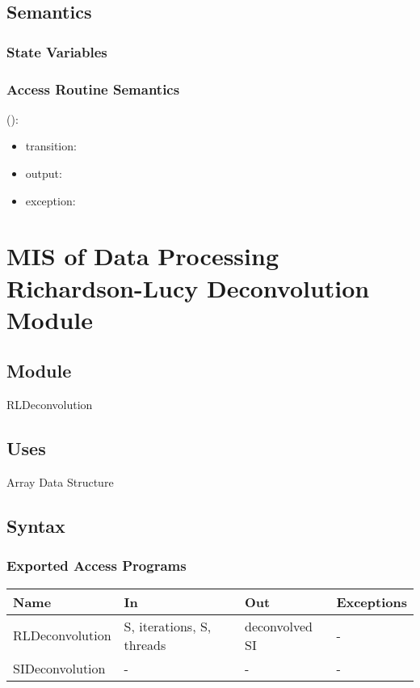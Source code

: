 \documentclass[12pt, titlepage]{article}
\begin{document}
\subsection{Semantics}

\subsubsection{State Variables}


\subsubsection{Access Routine Semantics}

\noindent {}():
\begin{itemize}
\item transition:  
\item output:  
\item exception:  
\end{itemize}

\section{MIS of Data Processing Richardson-Lucy Deconvolution Module} \label{Mod: RLDeconvolution}

\subsection{Module}

RLDeconvolution

\subsection{Uses}
Array Data Structure

\subsection{Syntax}

\subsubsection{Exported Access Programs}

\begin{center}
\begin{tabular}{p{4cm} p{4cm} p{4cm} p{2cm}}
\hline
\textbf{Name} & \textbf{In} & \textbf{Out} & \textbf{Exceptions} \\
\hline
RLDeconvolution & S, iterations, S, threads & deconvolved SI & - \\
SIDeconvolution & - & - & - \\
\hline
\end{tabular}
\end{center}
\end{document}
